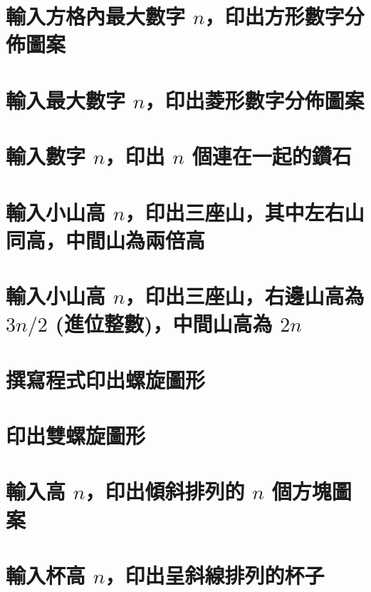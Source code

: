 \section{輸入方格內最大數字 $n$，印出方形數字分佈圖案}


\section{輸入最大數字 $n$，印出菱形數字分佈圖案}


\section{輸入數字 $n$，印出 $n$ 個連在一起的鑽石}


\section{輸入小山高 $n$，印出三座山，其中左右山同高，中間山為兩倍高}


\section{輸入小山高 $n$，印出三座山，右邊山高為 $3n/2$ (進位整數)，中間山高為 $2n$}


\section{撰寫程式印出螺旋圖形}


\section{印出雙螺旋圖形}


\section{輸入高 $n$，印出傾斜排列的 $n$ 個方塊圖案}


\section{輸入杯高 $n$，印出呈斜線排列的杯子}



